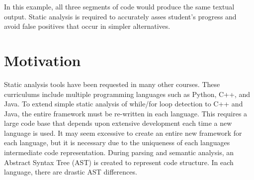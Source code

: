 \documentclass[thesis]{hmcposter}
\begin{document}
\begin{poster}
\begin{figure}
\begin{center}
\hspace{0.3in}
\end{center}
\end{figure}

In this example, all three segments of code would produce the same textual output. Static analysis is required to accurately asses student's progress and avoid false positives that occur in simpler alternatives.


\section{Motivation}
Static analysis tools have been requested in many other courses. These curriculums include multiple programming languages such as Python, C++, and Java. To extend simple static analysis of while/for loop detection to C++ and Java, the entire framework must be re-written in each language. This requires a large code base that depends upon extensive development each time a new language is used. It may seem excessive to create an entire new framework for each language, but it is necessary due to the uniqueness of each languages intermediate code representation. During parsing and semantic analysis, an Abstract Syntax Tree (AST) is created to represent code structure. In each language, there are drastic AST differences. 


\end{poster}
\end{document}
